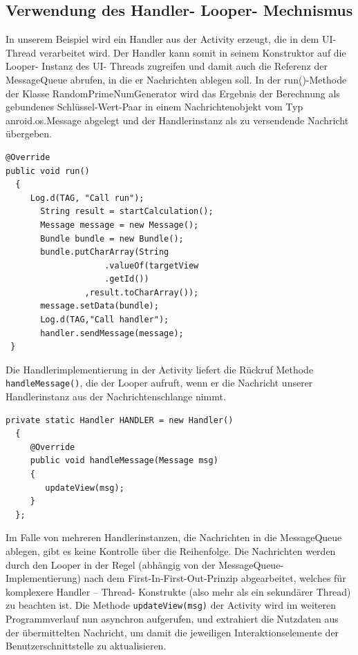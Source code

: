 \documentclass[12pt,oneside,a4paper,bibtotoc,liststotoc]{scrreprt}
\begin{document}
\subsection{Verwendung des Handler- Looper- Mechnismus }
In unserem Beispiel wird ein Handler aus der Activity erzeugt, die in dem UI-Thread verarbeitet wird. Der Handler kann somit in seinem Konstruktor auf die Looper- Instanz des UI- Threads zugreifen und damit auch die Referenz der MessageQueue abrufen, in die er Nachrichten ablegen soll. In der run()-Methode der Klasse RandomPrimeNumGenerator wird das Ergebnis der Berechnung als gebundenes Schlüssel-Wert-Paar in einem Nachrichtenobjekt vom Typ anroid.os.Message abgelegt und der Handlerinstanz als zu versendende Nachricht übergeben.\newline
\begin{lstlisting}
@Override
public void run()
  {
     Log.d(TAG, "Call run");
       String result = startCalculation();
       Message message = new Message();
       Bundle bundle = new Bundle();
       bundle.putCharArray(String
       				.valueOf(targetView
       				.getId())
       			,result.toCharArray());
       message.setData(bundle);
       Log.d(TAG,"Call handler");
       handler.sendMessage(message);
 }
\end{lstlisting}
Die Handlerimplementierung in der Activity liefert die Rückruf Methode \texttt{handleMessage()}, die der Looper aufruft, wenn er die Nachricht unserer Handlerinstanz aus der Nachrichtenschlange nimmt.\newline \begin{lstlisting} 
private static Handler HANDLER = new Handler()
  {
     @Override
     public void handleMessage(Message msg)
     {
        updateView(msg);
     }
  };
\end{lstlisting}
Im Falle von mehreren Handlerinstanzen, die Nachrichten in die MessageQueue ablegen, gibt es keine Kontrolle über die Reihenfolge. Die Nachrichten werden durch den Looper in der Regel (abhängig von der MessageQueue- Implementierung) nach dem First-In-First-Out-Prinzip abgearbeitet, welches für komplexere Handler – Thread- Konstrukte (also mehr als ein sekundärer Thread) zu beachten ist. Die Methode \texttt{updateView(msg)} der Activity wird im weiteren Programmverlauf nun asynchron aufgerufen, und extrahiert die Nutzdaten aus der übermittelten Nachricht, um damit die jeweiligen Interaktionselemente der Benutzerschnittstelle zu aktualisieren.\newline\newline
\end{document}
